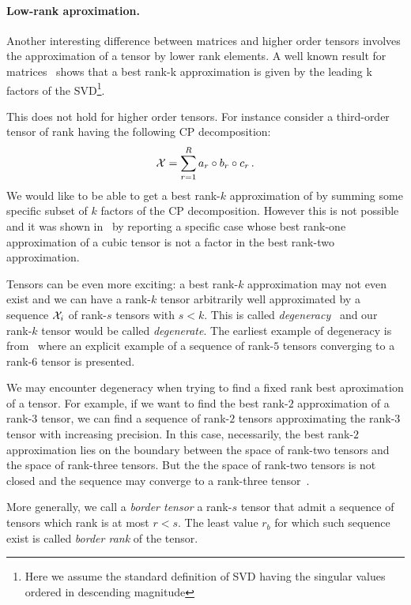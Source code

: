 \paragraph{Low-rank aproximation.}
Another interesting difference between matrices and higher order tensors involves the approximation of a tensor by lower rank elements.
A well known result for matrices~\cite{SVDbestapprox} shows that a best rank-k approximation is given by the leading k factors of the SVD\footnote{Here we assume the standard definition of SVD having the singular values ordered in descending magnitude}.

This does not hold for higher order tensors. For instance consider a third-order tensor of rank \R having the following CP decomposition:
\begin{equation*}
  \mathcal{X} = \sum_{r=1}^R a_r \circ b_r \circ c_r\, .
\end{equation*}
We would like to be able to get a best rank-$k$ approximation of \X by summing some specific subset of $k$ factors of the CP decomposition. However this is not possible and it was shown in~\cite{kolda2001orthogonal} by reporting a specific case whose best rank-one approximation of a cubic tensor is not a factor in the best rank-two approximation.

Tensors can be even more exciting: a best rank-$k$ approximation may not even exist and we can have a rank-$k$ tensor \X arbitrarily well approximated by a sequence ${\mathcal{X}_i}$ of rank-$s$ tensors with $s < k$. This is called \emph{degeneracy}~\cite{tensorreview} and our rank-$k$ tensor would be called \emph{degenerate}.
The earliest example of degeneracy is from~\cite{bini1980approximate} where an explicit example of a sequence of rank-$5$ tensors converging to a rank-$6$ tensor is presented.

We may encounter degeneracy when trying to find a fixed rank best aproximation of a tensor. For example, if we want to find the best rank-$2$ approximation of a rank-$3$ tensor, we can find a sequence of rank-$2$ tensors approximating the rank-$3$ tensor with increasing precision. In this case, necessarily, the best rank-$2$ approximation lies on the boundary between the space of rank-two tensors and the space of rank-three tensors. But the the space of rank-two tensors is not closed and the sequence may converge to a rank-three tensor~\cite{tensorreview}.

More generally, we call a \emph{border tensor} a rank-$s$ tensor that admit a sequence of tensors which rank is at most $r < s$. The least value $r_b$ for which such sequence exist is called \emph{border rank} of the tensor.

